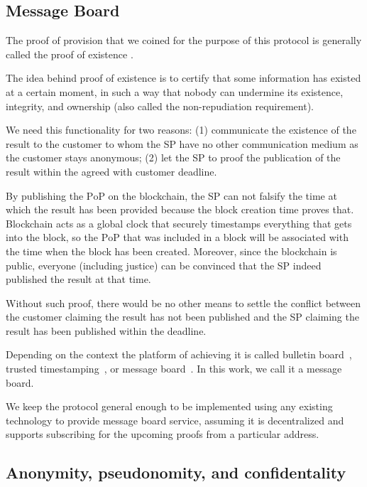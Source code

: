 \documentclass{ieeeaccess}
\begin{document}
\subsection{Message Board}\label{message-board}
The proof of provision that we coined for the purpose of this protocol is generally called the proof of existence
\cite{proofofexistence, de2016stampery, Chainpoi39}.

The idea behind proof of existence is to certify that some information
has existed at a certain moment, in such a way that nobody can
undermine its existence, integrity, and ownership (also called the
non-repudiation requirement).


We need this functionality for two reasons: (1) communicate the existence of the result to the customer to whom the SP have no other communication medium as the customer stays anonymous; (2) let the SP to proof the publication of the result within the agreed with customer deadline. 

By publishing the $\mathrm{PoP}$ on the blockchain, the SP can not falsify the time at which the result has been provided because the block creation time proves that. Blockchain acts as a global clock that securely timestamps everything that gets into the block, so the $\mathrm{PoP}$ that was included in a block will be associated with the time when the block has been created. Moreover, since the blockchain is public, everyone (including justice) can be convinced that the SP indeed published the result at that time.

Without such proof, there would be no other means to settle the conflict between the customer claiming the result has not been published and the SP claiming the result has been published within the deadline.

Depending on the context the platform of achieving it is called bulletin board~\cite{achenbach2015improved}, trusted timestamping~\cite{gipp2015decentralized}, or message board~\cite{hinarejos2019solution}. In this work, we call it a message board.

We keep the protocol general enough to be implemented using any existing technology to provide message board service, assuming it is decentralized and supports subscribing for the upcoming proofs from a particular address.

\subsection{Anonymity, pseudonomity, and confidentality}\label{sec:pseudo-anon}
\end{document}
